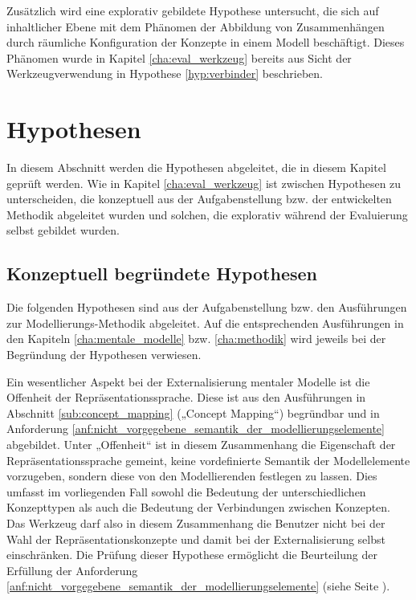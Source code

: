Zusätzlich wird eine explorativ gebildete Hypothese untersucht, die sich auf inhaltlicher Ebene mit dem Phänomen der Abbildung von Zusammenhängen durch räumliche Konfiguration der Konzepte in einem Modell beschäftigt. Dieses Phänomen wurde in Kapitel \ref{cha:eval_werkzeug} bereits aus Sicht der Werkzeugverwendung in Hypothese \ref{hyp:verbinder} beschrieben.

\section{Hypothesen} %
\label{sec:m_hypothesen}

In diesem Abschnitt werden die Hypothesen abgeleitet, die in diesem Kapitel geprüft werden. Wie in Kapitel \ref{cha:eval_werkzeug} ist zwischen Hypothesen zu unterscheiden, die konzeptuell aus der Aufgabenstellung bzw. der entwickelten Methodik abgeleitet wurden und solchen, die explorativ während der Evaluierung selbst gebildet wurden.

\subsection{Konzeptuell begründete Hypothesen} %
\label{sub:m_konzeptuell_begründete_hypothesen}

Die folgenden Hypothesen sind aus der Aufgabenstellung bzw. den Ausführungen zur Modellierungs-Methodik abgeleitet. Auf die entsprechenden Ausführungen in den Kapiteln \ref{cha:mentale_modelle} bzw. \ref{cha:methodik} wird jeweils bei der Begründung der Hypothesen verwiesen.

Ein wesentlicher Aspekt bei der Externalisierung mentaler Modelle ist die Offenheit der Repräsentationssprache. Diese ist aus den Ausführungen in Abschnitt \ref{sub:concept_mapping} („Concept Mapping“) begründbar und in Anforderung \ref{anf:nicht_vorgegebene_semantik_der_modellierungselemente} abgebildet. Unter „Offenheit“ ist in diesem Zusammenhang die Eigenschaft der Repräsentationssprache gemeint, keine vordefinierte Semantik der Modellelemente vorzugeben, sondern diese von den Modellierenden festlegen zu lassen. Dies umfasst im vorliegenden Fall sowohl die Bedeutung der unterschiedlichen Konzepttypen als auch die Bedeutung der Verbindungen zwischen Konzepten. Das Werkzeug darf also in diesem Zusammenhang die Benutzer nicht bei der Wahl der Repräsentationskonzepte und damit bei der Externalisierung selbst einschränken. Die Prüfung dieser Hypothese ermöglicht die Beurteilung der Erfüllung der Anforderung \ref{anf:nicht_vorgegebene_semantik_der_modellierungselemente} (siehe Seite \pageref{anf:nicht_vorgegebene_semantik_der_modellierungselemente}).

